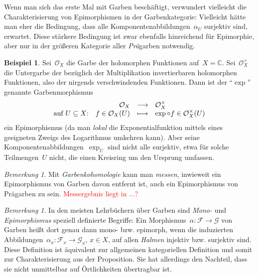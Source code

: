 \documentclass[a4paper,ngerman,12pt]{scrartcl}
\theoremstyle{definition}
\newtheorem{bsp}[defn]{Beispiel}
\theoremstyle{plain}
\theoremstyle{remark}
\newtheorem{bem}[defn]{Bemerkung}
\newcommand{\CC}{\mathbb{C}}
\newcommand{\F}{\mathcal{F}}
\newcommand{\G}{\mathcal{G}}
\renewcommand{\O}{\mathcal{O}}
\renewcommand{\_}{\mathpunct{.}\,}
\newcommand{\?}{\,{:}\,}
\newcommand{\XXX}[1]{\textcolor{red}{#1}}
\begin{document}
Wenn man sich das erste Mal mit Garben beschäftigt, verwundert vielleicht die
Charakterisierung von Epimorphismen in der Garbenkategorie: Vielleicht hätte man eher die
Bedingung, dass alle Komponentenabbildungen~$\alpha_U$ surjektiv sind,
erwartet. Diese stärkere Bedingung ist zwar ebenfalls hinreichend für Epimorphie,
aber nur in der größeren Kategorie aller \emph{Prä}garben notwendig.

\begin{bsp}Sei~$\O_X$ die Garbe der holomorphen Funktionen auf~$X = \CC$.
Sei~$\O_X^\times$ die Untergarbe der bezüglich der Multiplikation
invertierbaren holomorphen Funktionen, also der nirgends verschwindenden
Funktionen. Dann ist der "`$\exp$"' genannte Garbenmorphismus
\[ \begin{array}{@{}rrcl@{}}
           & \O_X &\longrightarrow& \O_X^\times \\
  \text{auf $U \subseteq X$:} & f \in \O_X(U) &\longmapsto& \exp \circ f \in
  \O_X^\times(U)
\end{array} \]
ein Epimorphismus (da man \emph{lokal} die Exponentialfunktion mittels eines
geeigneten Zweigs des Logarithmus umkehren kann). Aber seine
Komponentenabbildungen~$\exp_U$ sind nicht alle surjektiv, etwa für solche
Teilmengen~$U$ nicht, die einen Kreisring um den Ursprung umfassen.\end{bsp}

\begin{bem}Mit \emph{Garbenkohomologie} kann man \emph{messen}, inwieweit ein
Epimorphismus von Garben davon entfernt ist, auch ein Epimorphismus von
Prägarben zu sein. \XXX{Messergebnis liegt in ...?}
\end{bem}

\begin{bem}In den meisten Lehrbüchern über Garben sind \emph{Mono-} und \emph{Epimorphismus} speziell
definierte Begriffe: Ein Morphismus~$\alpha : \F \to \G$ von Garben heißt dort genau dann
mono- bzw. epimorph, wenn die induzierten Abbildungen~$\alpha_x : \F_x \to
\G_x$, $x \in X$, auf allen \emph{Halmen} injektiv bzw. surjektiv sind. Diese
Definition ist äquivalent zur allgemeinen kategoriellen Definition und somit
zur Charakterisierung aus der Proposition. Sie hat allerdings den Nachteil, dass sie nicht
unmittelbar auf Örtlichkeiten übertragbar ist.\end{bem}


\nocite{*}
\printbibliography
\end{document}
